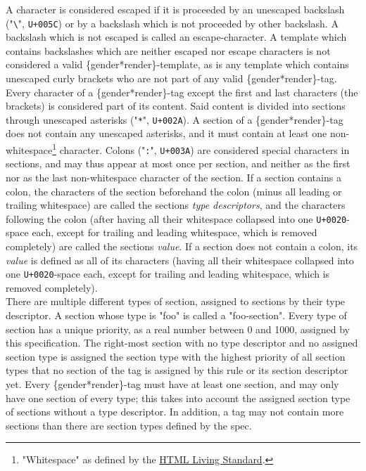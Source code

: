 \documentclass{article}
\begin{document}
    A character is considered escaped if it is proceeded by an unescaped backslash ("\texttt{\textbackslash}", \texttt{U+005C}) or by a backslash which is not proceeded by other backslash.
    A backslash which is not escaped is called an escape-character.
    A template which contains backslashes which are neither escaped nor escape characters is not considered a valid \{gender*render\}-template, as is any template which contains unescaped curly brackets who are not part of any valid \{gender*render\}-tag.\\

    Every character of a \{gender*render\}-tag except the first and last characters (the brackets) is considered part of its content.
    Said content is divided into sections through unescaped asterisks ("\texttt{*}", \texttt{U+002A}).
    A section of a \{gender*render\}-tag does not contain any unescaped asterisks, and it must contain at least one non-whitespace\footnote{"Whitespace" as defined by the \href{https://infra.spec.whatwg.org/\#ascii-whitespace}{HTML Living Standard}.} character.
    Colons ("\texttt{:}", \texttt{U+003A}) are considered special characters in sections, and may thus appear at most once per section, and neither as the first nor as the last non-whitespace  character of the section.
    If a section contains a colon, the characters of the section beforehand the colon (minus all leading or trailing whitespace) are called the sections \emph{type descriptors}, and the characters following the colon (after having all their whitespace collapsed into one \texttt{U+0020}-space each, except for trailing and leading whitespace, which is removed completely) are called the sections \emph{value}.
    If a section does not contain a colon, its \emph{value} is defined as all of its characters (having all their whitespace collapsed into one \texttt{U+0020}-space each, except for trailing and leading whitespace, which is removed completely).\\

    There are multiple different types of section, assigned to sections by their type descriptor.
    A section whose type is "foo" is called a "foo-section".
    Every type of section has a unique priority, as a real number between 0 and 1000, assigned by this specification.
    The right-most section with no type descriptor and no assigned section type is assigned the section type with the highest priority of all section types that no section of the tag is assigned by this rule or its section descriptor yet.
    Every \{gender*render\}-tag must have at least one section, and may only have one section of every type;
    this takes into account the assigned section type of sections without a type descriptor.
    In addition, a tag may not contain more sections than there are section types defined by the spec.\\
\end{document}
